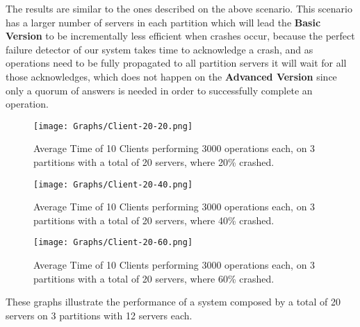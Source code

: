 \documentclass[times, 10pt,twocolumn]{article}
\begin{document}
The results are similar to the ones described on the above scenario. This scenario has a larger number of servers in each partition which will lead the \textbf{Basic Version} to be incrementally less efficient when crashes occur, because the perfect failure detector of our system takes time to acknowledge a crash, and as operations need to be fully propagated to all partition servers it will wait for all those acknowledges, which does not happen on the \textbf{Advanced Version} since only a quorum of answers is needed in order to successfully complete an operation.
\begin{figure}[h!]
	\centering
	\texttt{[image: Graphs/Client-20-20.png]}
	\caption{Average Time of 10 Clients performing 3000 operations each, on 3 partitions with a total of 20 servers, where 20\% crashed.}
	\vspace{0.15in}
	\centering
	\texttt{[image: Graphs/Client-20-40.png]}
	\caption{Average Time of 10 Clients performing 3000 operations each, on 3 partitions with a total of 20 servers, where 40\% crashed.}
\end{figure}
\newpage
\begin{figure}[h!]
	\centering
	\texttt{[image: Graphs/Client-20-60.png]}
	\caption{Average Time of 10 Clients performing 3000 operations each, on 3 partitions with a total of 20 servers, where 60\% crashed.}
\end{figure}
These graphs illustrate the performance of a system composed by a total of 20 servers on 3 partitions with 12 servers each.
\end{document}
